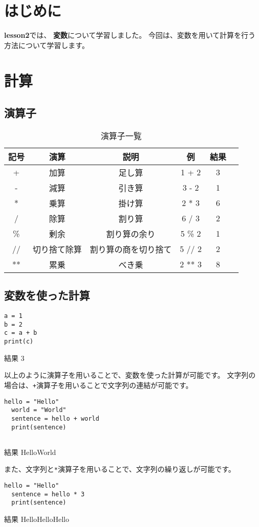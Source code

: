 \documentclass[a4paper,titlepage,dvipdfmx]{jarticle}
\begin{document}
\section{はじめに}
\textbf{lesson2}では、
\textbf{変数}について学習しました。
今回は、変数を用いて計算を行う方法について学習します。
\section{計算}
\subsection{演算子}
\begin{table}[H]
  \centering
  \caption{演算子一覧}
  \begin{tabular}{|c|c|c|c|c|c|}
    \hline
    記号 & 演算     & 説明         & 例      & 結果 \\ \hline
    +  & 加算     & 足し算        & 1 + 2  & 3  \\ \hline
    -  & 減算     & 引き算        & 3 - 2  & 1  \\ \hline
    *  & 乗算     & 掛け算        & 2 * 3  & 6  \\ \hline
    /  & 除算     & 割り算        & 6 / 3  & 2  \\ \hline
    \% & 剰余     & 割り算の余り     & 5 \% 2 & 1  \\ \hline
    // & 切り捨て除算 & 割り算の商を切り捨て & 5 // 2 & 2  \\ \hline
    ** & 累乗     & べき乗        & 2 ** 3 & 8  \\ \hline
  \end{tabular}
\end{table}
\subsection{変数を使った計算}
\begin{lstlisting}[caption=変数を使った計算,label=変数を使った計算]
a = 1
b = 2
c = a + b
print(c)
\end{lstlisting}
\begin{itembox}[l]{結果}
  3
\end{itembox}
以上のように演算子を用いることで、変数を使った計算が可能です。
文字列の場合は、\texttt{+}演算子を用いることで文字列の連結が可能です。
\begin{lstlisting}[caption=文字列の連結,label=文字列の連結]
  hello = "Hello"
  world = "World"
  sentence = hello + world
  print(sentence)
  
\end{lstlisting}
\begin{itembox}[l]{結果}
  HelloWorld
\end{itembox}
また、文字列と\texttt{*}演算子を用いることで、文字列の繰り返しが可能です。
\begin{lstlisting}[caption=文字列の繰り返し,label=文字列の繰り返し]
  hello = "Hello"
  sentence = hello * 3
  print(sentence)
\end{lstlisting}
\begin{itembox}[l]{結果}
  HelloHelloHello
\end{itembox}
\end{document}
